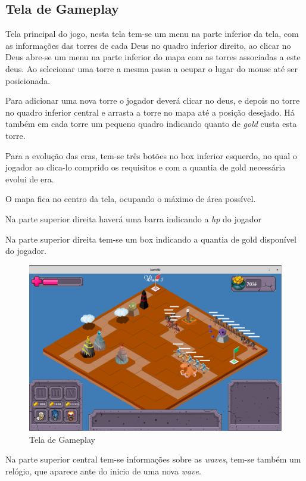 \documentclass[11pt]{article} %
\begin{document}
\newpage

\subsection{Tela de Gameplay}

Tela principal do jogo, nesta tela tem-se um menu na parte inferior da tela, com as informações das torres de cada Deus no quadro inferior direito, ao clicar no Deus abre-se um menu na parte inferior do mapa com as torres associadas a este deus. Ao selecionar uma torre a mesma passa a ocupar o lugar do mouse até ser posicionada.

Para adicionar uma nova torre o jogador deverá clicar no deus, e depois no torre no quadro inferior central e arrasta a torre no mapa até a posição desejado. Há também em cada torre um pequeno quadro indicando quanto de \textit{gold} custa esta torre.

Para a evolução das eras, tem-se três botões no box inferior esquerdo, no qual o jogador ao clica-lo comprido os requisitos e com a quantia de gold necessária evolui de era.

O mapa fica no centro da tela, ocupando o máximo de área possível.

Na parte superior direita haverá uma barra indicando a \textit{hp} do jogador

Na parte superior direita tem-se um box indicando a quantia de gold disponível do jogador.

\begin{figure}[!htp]
\centering
\includegraphics[scale=0.3]{res/gameplay_display.png}
\caption{Tela de Gameplay}
\end{figure}

Na parte superior central tem-se informações sobre as \textit{waves}, tem-se também um relógio, que aparece ante do inicio de uma nova \textit{wave}.
\end{document}
